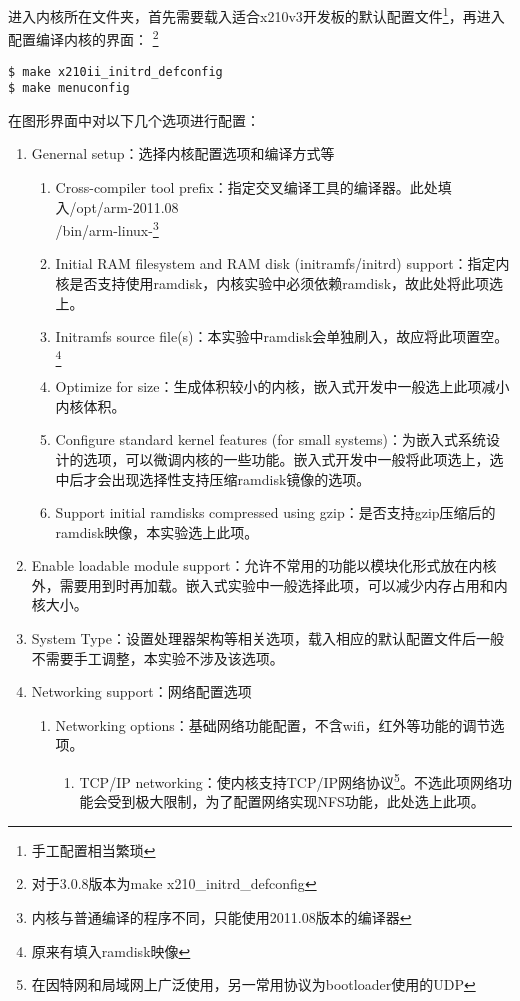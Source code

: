 \documentclass[hyperref,UTF8]{ctexart}
\begin{document}
进入内核所在文件夹，首先需要载入适合x210v3开发板的默认配置文件\footnote{手工配置相当繁琐}，再进入配置编译内核的界面：\label{para:kern-init} \footnote{对于3.0.8版本为make x210\_initrd\_defconfig}
\begin{Verbatim}[frame=single]
$ make x210ii_initrd_defconfig
$ make menuconfig
\end{Verbatim}

在图形界面中对以下几个选项进行配置：\label{para:kern-conf}
\begin{enumerate}
    \item Genernal setup：选择内核配置选项和编译方式等
    \begin{enumerate}
        \item Cross-compiler tool prefix：指定交叉编译工具的编译器。此处填入/opt/arm-2011.08\\/bin/arm-linux-\footnote{内核与普通编译的程序不同，只能使用2011.08版本的编译器}
        \item Initial RAM filesystem and RAM disk (initramfs/initrd) support：指定内核是否支持使用ramdisk，内核实验中必须依赖ramdisk，故此处将此项选上。
        \item Initramfs source file(s)：本实验中ramdisk会单独刷入，故应将此项置空。\label{item:ramimg}\footnote{原来有填入ramdisk映像}
        \item Optimize for size：生成体积较小的内核，嵌入式开发中一般选上此项减小内核体积。
        \item Configure standard kernel features (for small systems)：为嵌入式系统设计的选项，可以微调内核的一些功能。嵌入式开发中一般将此项选上，选中后才会出现选择性支持压缩ramdisk镜像的选项。
        \item Support initial ramdisks compressed using gzip：是否支持gzip压缩后的ramdisk映像，本实验选上此项。
    \end{enumerate}
    \item Enable loadable module support：允许不常用的功能以模块化形式放在内核外，需要用到时再加载。嵌入式实验中一般选择此项，可以减少内存占用和内核大小。
    \item System Type：设置处理器架构等相关选项，载入相应的默认配置文件后一般不需要手工调整，本实验不涉及该选项。
    \item Networking support：网络配置选项
    \begin{enumerate}
        \item Networking options：基础网络功能配置，不含wifi，红外等功能的调节选项。
        \begin{enumerate}
            \item TCP/IP networking：使内核支持TCP/IP网络协议\footnote{在因特网和局域网上广泛使用，另一常用协议为bootloader使用的UDP}。不选此项网络功能会受到极大限制，为了配置网络实现NFS功能，此处选上此项。

\end{enumerate}
\end{enumerate}
\end{enumerate}
\end{document}
